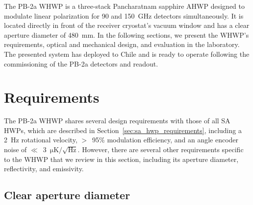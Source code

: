 The PB-2a WHWP is a three-stack Pancharatnam sapphire AHWP designed to modulate linear polarization for 90 and 150~GHz detectors simultaneously. It is located directly in front of the receiver cryostat's vacuum window and has a clear aperture diameter of 480~mm. In the following sections, we present the WHWP's requirements, optical and mechanical design, and evaluation in the laboratory. The presented system has deployed to Chile and is ready to operate following the commissioning of the PB-2a detectors and readout.


\section{Requirements}
\label{sec:pb2a_whwp_requirements}

The PB-2a WHWP shares several design requirements with those of all SA HWPs, which are described in Section~\ref{sec:sa_hwp_requirements}, including a 2~Hz rotational velocity, $>$~95\% modulation efficiency, and an angle encoder noise of $\ll$~3~$\mathrm{\mu K / \sqrt{Hz}}$. However, there are several other requirements specific to the WHWP that we review in this section, including its aperture diameter, reflectivity, and emissivity.


\subsection{Clear aperture diameter}
\label{sec:pb2a_whwp_clear_aperture_diameter}

